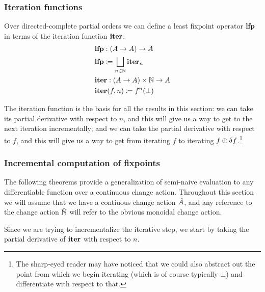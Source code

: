 \subsubsection{Iteration functions}
\label{sec:iteration}

Over directed-complete partial orders we can define a least fixpoint operator $\mathbf{lfp}$ in terms of the
iteration function $\mathbf{iter}$:
\begin{align*}
  &\mathbf{lfp} : (A \rightarrow A) \rightarrow A\\
  &\mathbf{lfp} \coloneqq \bigsqcup_{n \in \mathbb{N}} \mathbf{iter}_n \\
  &\mathbf{iter} : (A \rightarrow A) \times \mathbb{N} \rightarrow A\\
  &\mathbf{iter}(f, n) \coloneqq f^n(\bot)
\end{align*}

The iteration function is the basis for all the results in this section:
we can take its partial derivative with respect to $n$, and this will give us a way to get
to the next iteration incrementally; and we can take the partial derivative
with respect to $f$, and this will give us a way to get from iterating $f$ to iterating $f
\oplus \delta f$.\footnote{
  The sharp-eyed reader may have noticed that we
  could also abstract out the point from which we begin iterating (which is of
  course typically $\bot$) and differentiate with respect to that.
}

\subsubsection{Incremental computation of fixpoints}

The following theorems provide a
generalization of semi-naive evaluation to any differentiable function over a
continuous change action. Throughout this section we will assume that we have a contiuous change action
$\hat{A}$, and any reference to the change action $\hat{\mathbb{N}}$ will refer to the obvious monoidal
change action.


Since we are trying to incrementalize the iterative step, we start by taking the partial
derivative of $\mathbf{iter}$ with respect to $n$.

